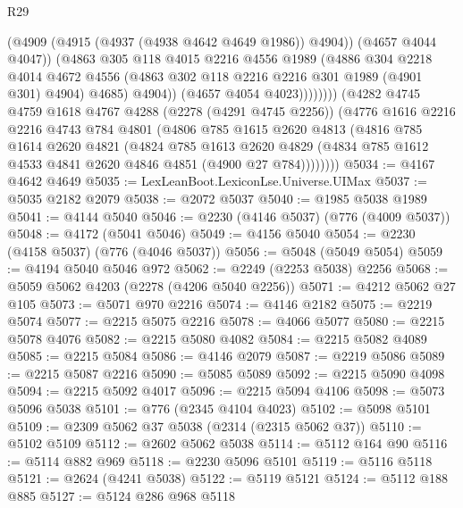 \begin{lexlean}{R29}
\begin{coremodule}
                        (@4909 (@4915 (@4937 (@4938 @4642 @4649 @1986)) @4904))
                        (@4657 @4044 @4047))
                      (@4863
                        @305
                        @118
                        @4015
                        @2216
                        @4556
                        @1989
                        (@4886
                          @304
                          @2218
                          @4014
                          @4672
                          @4556
                          (@4863 @302 @118 @2216 @2216 @301 @1989 (@4901 @301) @4904)
                          @4685)
                        @4904))
                    (@4657 @4054 @4023))))))))
      (@4282
        @4745
        @4759
        @1618
        @4767
        @4288
        (@2278 (@4291 @4745 @2256))
        (@4776
          @1616
          @2216
          @2216
          @4743
          @784
          @4801
          (@4806
            @785
            @1615
            @2620
            @4813
            (@4816
              @785
              @1614
              @2620
              @4821
              (@4824
                @785
                @1613
                @2620
                @4829
                (@4834 @785 @1612 @4533 @4841 @2620 @4846 @4851 (@4900 @27 @784))))))))
@5034 := @4167 @4642 @4649
@5035 := LexLeanBoot.LexiconLse.Universe.UIMax
@5037 := @5035 @2182 @2079
@5038 := @2072 @5037
@5040 := @1985 @5038 @1989
@5041 := @4144 @5040
@5046 := @2230 (@4146 @5037) (@776 (@4009 @5037))
@5048 := @4172 (@5041 @5046)
@5049 := @4156 @5040
@5054 := @2230 (@4158 @5037) (@776 (@4046 @5037))
@5056 := @5048 (@5049 @5054)
@5059 := @4194 @5040 @5046 @972
@5062 := @2249 (@2253 @5038) @2256
@5068 := @5059 @5062 @4203 (@2278 (@4206 @5040 @2256))
@5071 := @4212 @5062 @27 @105
@5073 := @5071 @970 @2216
@5074 := @4146 @2182
@5075 := @2219 @5074
@5077 := @2215 @5075 @2216
@5078 := @4066 @5077
@5080 := @2215 @5078 @4076
@5082 := @2215 @5080 @4082
@5084 := @2215 @5082 @4089
@5085 := @2215 @5084
@5086 := @4146 @2079
@5087 := @2219 @5086
@5089 := @2215 @5087 @2216
@5090 := @5085 @5089
@5092 := @2215 @5090 @4098
@5094 := @2215 @5092 @4017
@5096 := @2215 @5094 @4106
@5098 := @5073 @5096 @5038
@5101 := @776 (@2345 @4104 @4023)
@5102 := @5098 @5101
@5109 := @2309 @5062 @37 @5038 (@2314 (@2315 @5062 @37))
@5110 := @5102 @5109
@5112 := @2602 @5062 @5038
@5114 := @5112 @164 @90
@5116 := @5114 @882 @969
@5118 := @2230 @5096 @5101
@5119 := @5116 @5118
@5121 := @2624 (@4241 @5038)
@5122 := @5119 @5121
@5124 := @5112 @188 @885
@5127 := @5124 @286 @968 @5118

\end{coremodule}
\end{lexlean}
